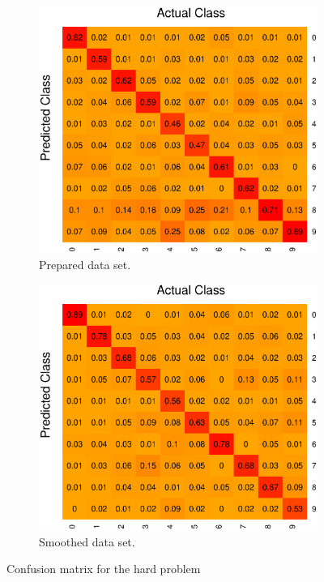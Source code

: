 \begin{figure}[H]
\centering
\begin{subfigure}{0.45\textwidth}
\includegraphics[width=\textwidth]{graphics/tree_confusion_all}
\caption{Prepared data set.}
\end{subfigure}
\begin{subfigure}{0.45\textwidth}
\includegraphics[width=\textwidth]{graphics/tree_confusion_all2}
\caption{Smoothed data set.}
\end{subfigure}
\caption{Confusion matrix for the hard problem}
\label{fig:tree_confus_all}
\end{figure}

